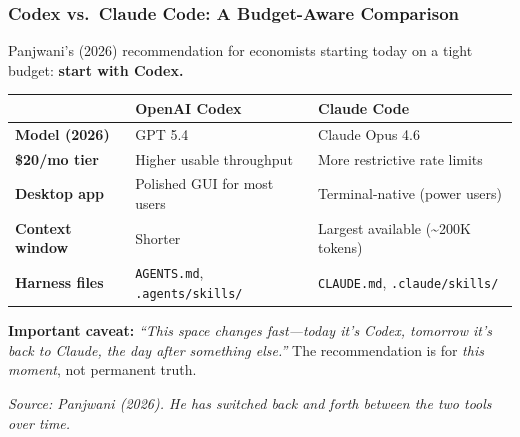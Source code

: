 \documentclass[10pt,english,aspectratio=169]{beamer}
\begin{document}
\begin{frame}
\frametitle{Codex vs.\ Claude Code: A Budget-Aware Comparison}

Panjwani's (2026) recommendation for economists starting today on a tight budget: \textbf{start with Codex.}

\vspace{0.2cm}

\begin{center}
\small
\begin{tabular}{|l|p{5.0cm}|p{5.0cm}|}
\hline
& \textbf{OpenAI Codex} & \textbf{Claude Code} \\ \hline
\textbf{Model (2026)} & GPT 5.4 & Claude Opus 4.6 \\ \hline
\textbf{\$20/mo tier} & Higher usable throughput & More restrictive rate limits \\ \hline
\textbf{Desktop app} & Polished GUI for most users & Terminal-native (power users) \\ \hline
\textbf{Context window} & Shorter & Largest available (\textasciitilde200K tokens) \\ \hline
\textbf{Harness files} & \texttt{AGENTS.md}, \texttt{.agents/skills/} & \texttt{CLAUDE.md}, \texttt{.claude/skills/} \\ \hline
\end{tabular}
\end{center}

\vspace{0.2cm}

\textbf{Important caveat:} \textit{``This space changes fast---today it's Codex, tomorrow it's back to Claude, the day after something else.''} The recommendation is for \textit{this moment}, not permanent truth.

\vspace{0.1cm}

\textit{Source: Panjwani (2026). He has switched back and forth between the two tools over time.}
\end{frame}
\end{document}
